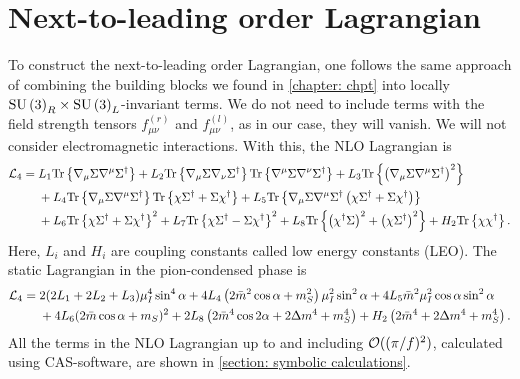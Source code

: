 \section{Next-to-leading order Lagrangian}
\label{section: nlo chpt}


To construct the next-to-leading order Lagrangian, one follows the same approach of combining the building blocks we found in \autoref{chapter: chpt} into locally $\text{SU}\left(3\right)_R\times\text{SU}\left(3\right)_L$-invariant terms.
We do not need to include terms with the field strength tensors $f_{\mu\nu}^{(r)}$ and $f_{\mu\nu}^{(l)}$, as in our case, they will vanish.
We will not consider electromagnetic interactions.
With this, the NLO Lagrangian is~\autocite{gasserChiralPerturbationTheory1985}
%
\begin{align}
    \label{NLO Lagrangian three flavor}
    \nonumber
    \mathcal{L}_4 
    ={} &
    L_1\text{Tr} \left\{ \nabla_\mu \Sigma \nabla^\mu \Sigma^\dagger \right\}
    + L_2 \text{Tr} \left\{ \nabla_\mu \Sigma \nabla_\nu \Sigma^\dagger \right\} 
    \text{Tr} \left\{ \nabla^\mu \Sigma \nabla^\nu \Sigma^\dagger \right\}
    + L_3 \text{Tr} \left\{ \left(\nabla_\mu \Sigma \nabla^\mu \Sigma^\dagger\right)^2 \right\} \\ \nonumber
    & + L_4 \text{Tr} \left\{ \nabla_\mu \Sigma \nabla^\mu \Sigma^\dagger \right\} 
    \text{Tr} \left\{ \chi \Sigma^\dagger + \Sigma \chi^\dagger \right\}
    + L_5 \text{Tr} \left\{ 
        \nabla_\mu \Sigma \nabla^\mu \Sigma^\dagger 
        \left(\chi \Sigma^\dagger + \Sigma \chi^\dagger\right)
     \right\}\\
    &+ L_6 \text{Tr} \left\{ \chi \Sigma^\dagger + \Sigma \chi^\dagger \right\}^2 
     + L_7 \text{Tr} \left\{ \chi \Sigma^\dagger - \Sigma \chi^\dagger \right\}^2
    + L_8 \text{Tr} \left\{  \left(\chi^\dagger \Sigma \right)^2 + \left(\chi \Sigma^\dagger \right)^2 \right\}
    + H_2 \text{Tr} \left\{ \chi \chi^\dagger \right\}.
\end{align}
%
Here, $L_i$ and $H_i$ are coupling constants called low energy constants (LEO).
The static Lagrangian in the pion-condensed phase is
%
\begin{align}
    \nonumber
    \mathcal{L}_4
    = {}&
    2(2L_1 + 2L_2 + L_3) \mu_I^4 \sin^4\alpha
    + 4  L_4 \left( 2 \bar m^2 \cos\alpha + m_S^2 \right) \mu_I^2\sin^2\alpha
    + 4 L_5 \bar m^2 \mu_I^2 \cos\alpha \sin^2 \alpha 
    \\ & 
    + 4 L_6 (2\bar m\cos\alpha + m_S)^2
    + 2 L_8 \left(2 \bar m^4 \cos2\alpha + 2 \Delta m^4 + m_S^4\right)
    + H_2 \left(2\bar m^4 + 2\Delta m^4 + m_S^4 \right).
\end{align}
%
All the terms in the NLO Lagrangian up to and including $\mathcal O((\pi/f)^2)$, calculated using CAS-software, are shown in \autoref{section: symbolic calculations}.

